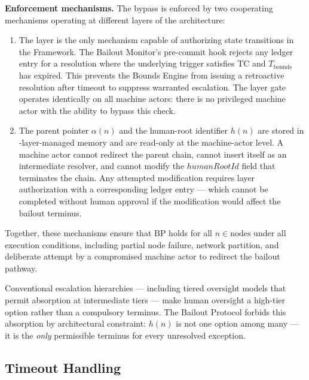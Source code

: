 \bigskip
\noindent\textbf{Enforcement mechanisms.} The bypass is enforced by two cooperating mechanisms operating at different layers of the \bxthree{} architecture:

\begin{enumerate}
\item[\textbf{Fact Layer gate (enforcement at the authorization layer).}] The \fact{} layer is the only mechanism capable of authorizing state transitions in the \bxthree{} Framework. The Bailout Monitor's pre-commit hook rejects any ledger entry for a resolution where the underlying trigger satisfies TC and $T_{\text{bounds}}$ has expired. This prevents the Bounds Engine from issuing a retroactive resolution after timeout to suppress warranted escalation. The \fact{} layer gate operates identically on all machine actors: there is no privileged machine actor with the ability to bypass this check.

\item[\textbf{Immutable parent-pointer and human-root architecture (enforcement at the data model layer).}] The parent pointer $\alpha(n)$ and the human-root identifier $h(n)$ are stored in \fact-layer-managed memory and are read-only at the machine-actor level. A machine actor cannot redirect the parent chain, cannot insert itself as an intermediate resolver, and cannot modify the $humanRootId$ field that terminates the chain. Any attempted modification requires \purpose{} layer authorization with a corresponding ledger entry --- which cannot be completed without human approval if the modification would affect the bailout terminus.
\end{enumerate}

Together, these mechanisms ensure that BP holds for all $n \in \text{nodes}$ under all execution conditions, including partial node failure, network partition, and deliberate attempt by a compromised machine actor to redirect the bailout pathway.

Conventional escalation hierarchies --- including tiered oversight models that permit absorption at intermediate tiers --- make human oversight a high-tier option rather than a compulsory terminus. The Bailout Protocol forbids this absorption by architectural constraint: $h(n)$ is not one option among many --- it is the \emph{only} permissible terminus for every unresolved exception.

\subsection{Timeout Handling}\label{sec:timeout-handling}


